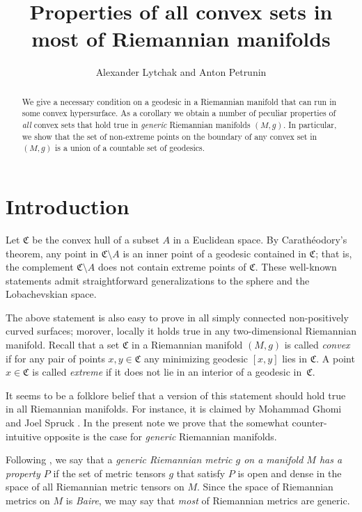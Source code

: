\documentclass[a4paper,10pt]{article}
\begin{document}
 
\title{Properties of all convex sets in\\
most of Riemannian manifolds}
\author{Alexander Lytchak and Anton Petrunin}
\date{}
\maketitle

\begin{abstract}
We give a necessary condition on a geodesic in a Riemannian manifold that can run in some convex hypersurface.
As a corollary we obtain a number of peculiar properties of \emph{all} convex sets that hold true in \emph{generic} Riemannian manifolds $(M,g)$.
In particular, we show that the set of non-extreme points on the boundary of any convex set in $(M,g)$
is a union of a countable set of geodesics.
\end{abstract}

\section{Introduction}
Let $\mathfrak{C}$ be the convex hull of a subset $A$ in a Euclidean space.
By Carathéodory's theorem, any point in $\mathfrak{C}\setminus A$ is an inner point of a geodesic contained in $\mathfrak{C}$;
that is, the complement $\mathfrak{C} \setminus A$ does not contain extreme points of $\mathfrak{C}$.  
These well-known statements admit straightforward generalizations to the sphere and the Lobachevskian space.
 
The above statement is also easy to prove in all simply connected non-positively curved surfaces;
morover, locally it holds true in any two-dimensional Riemannian manifold.
Recall that a set $\mathfrak{C}$ in a Riemannian manifold $(M,g)$ is called \emph{convex} if for any pair of points $x,y\in \mathfrak{C}$ any minimizing geodesic $[x,y]$ lies in $\mathfrak{C}$.
A point $x\in \mathfrak{C}$ is called \emph{extreme} if it does not lie in an interior of a geodesic in~$\mathfrak{C}$.

It seems to be a folklore belief that a version of this statement should hold true in all Riemannian manifolds. 
For instance, it is claimed by Mohammad Ghomi and Joel Spruck \cite[Lemma 9.1]{Ghomi}.
In the present note we prove that the somewhat counter-intuitive opposite is the case for \emph{generic} Riemannian manifolds. 

Following \cite{eliashberg-mishachev}, we say that a \emph{generic Riemannian metric $g$ on a manifold $M$ 
has a property $P$} if the set of metric tensors $g$ that satisfy $P$ is open and dense in the space of all Riemannian metric tensors on $M$.
Since the space of Riemannian metrics on $M$ is \emph{Baire}, we may say that \emph{most} of Riemannian metrics are generic.
\end{document}
